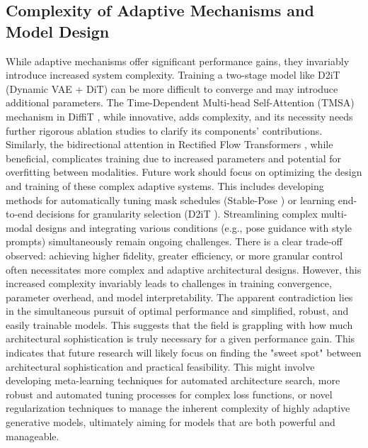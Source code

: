 \documentclass[a4paper]{article}
\begin{document}
\subsection{Complexity of Adaptive Mechanisms and Model Design}
While adaptive mechanisms offer significant performance gains, they invariably introduce increased system complexity. Training a two-stage model like D2iT \cite{Jia2025D2iT} (Dynamic VAE + DiT) can be more difficult to converge and may introduce additional parameters. The Time-Dependent Multi-head Self-Attention (TMSA) mechanism in DiffiT \cite{Hatamizadeh2023DiffiT}, while innovative, adds complexity, and its necessity needs further rigorous ablation studies to clarify its components' contributions. Similarly, the bidirectional attention in Rectified Flow Transformers \cite{Esser2024ScalingRectifiedFlow}, while beneficial, complicates training due to increased parameters and potential for overfitting between modalities. Future work should focus on optimizing the design and training of these complex adaptive systems. This includes developing methods for automatically tuning mask schedules (Stable-Pose \cite{Wang2024StablePose}) or learning end-to-end decisions for granularity selection (D2iT \cite{Jia2025D2iT}). Streamlining complex multi-modal designs and integrating various conditions (e.g., pose guidance with style prompts) simultaneously remain ongoing challenges. There is a clear trade-off observed: achieving higher fidelity, greater efficiency, or more granular control often necessitates more complex and adaptive architectural designs. However, this increased complexity invariably leads to challenges in training convergence, parameter overhead, and model interpretability. The apparent contradiction lies in the simultaneous pursuit of optimal performance and simplified, robust, and easily trainable models. This suggests that the field is grappling with how much architectural sophistication is truly necessary for a given performance gain. This indicates that future research will likely focus on finding the "sweet spot" between architectural sophistication and practical feasibility. This might involve developing meta-learning techniques for automated architecture search, more robust and automated tuning processes for complex loss functions, or novel regularization techniques to manage the inherent complexity of highly adaptive generative models, ultimately aiming for models that are both powerful and manageable.
\end{document}
